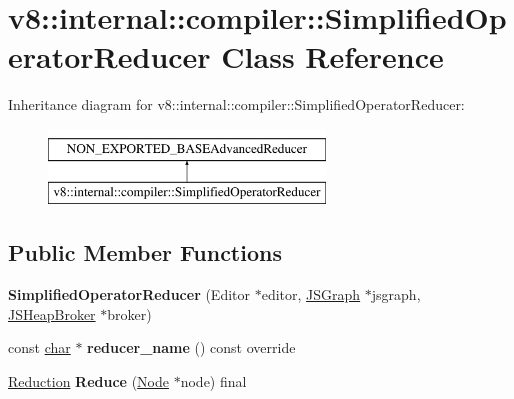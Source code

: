 \hypertarget{classv8_1_1internal_1_1compiler_1_1SimplifiedOperatorReducer}{}\section{v8\+:\+:internal\+:\+:compiler\+:\+:Simplified\+Operator\+Reducer Class Reference}
\label{classv8_1_1internal_1_1compiler_1_1SimplifiedOperatorReducer}
Inheritance diagram for v8\+:\+:internal\+:\+:compiler\+:\+:Simplified\+Operator\+Reducer\+:\begin{figure}[H]
\begin{center}
\leavevmode
\includegraphics[height=2.000000cm]{classv8_1_1internal_1_1compiler_1_1SimplifiedOperatorReducer}
\end{center}
\end{figure}
\subsection*{Public Member Functions}
\begin{DoxyCompactItemize}
\item 
\mbox{\label{classv8_1_1internal_1_1compiler_1_1SimplifiedOperatorReducer_a6603f161fa289623230cbcc496c140da}} 
{\bfseries Simplified\+Operator\+Reducer} (Editor $\ast$editor, \mbox{\hyperlink{classv8_1_1internal_1_1compiler_1_1JSGraph}{J\+S\+Graph}} $\ast$jsgraph, \mbox{\hyperlink{classv8_1_1internal_1_1compiler_1_1JSHeapBroker}{J\+S\+Heap\+Broker}} $\ast$broker)
\item 
\mbox{\label{classv8_1_1internal_1_1compiler_1_1SimplifiedOperatorReducer_a4ae458d329f31ec0903e2c611ed98ee5}} 
const \mbox{\hyperlink{classchar}{char}} $\ast$ {\bfseries reducer\+\_\+name} () const override
\item 
\mbox{\label{classv8_1_1internal_1_1compiler_1_1SimplifiedOperatorReducer_a8ef4168530bf93070596299768ac3fa0}} 
\mbox{\hyperlink{classv8_1_1internal_1_1compiler_1_1Reduction}{Reduction}} {\bfseries Reduce} (\mbox{\hyperlink{classv8_1_1internal_1_1compiler_1_1Node}{Node}} $\ast$node) final
\end{DoxyCompactItemize}


